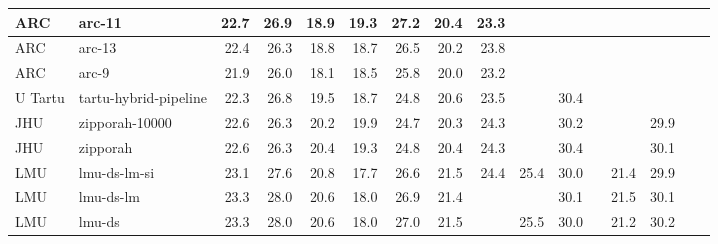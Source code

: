 \begin{table*}
\begin{center}
\begin{tabular}{|l|l|rrrrrrr|rrrrrrr|}
ARC & arc-11 & 22.7 & 26.9 & 18.9 & 19.3 & 27.2 & 20.4 & 23.3 & \cellcolor{lightgreen}{26.1} & \cellcolor{lightyellow}{30.8} & \cellcolor{lightyellow}{22.7} & \cellcolor{lightgreen}{22.4} & \cellcolor{lightyellow}{30.9} & \cellcolor{lightyellow}{23.5} & \cellcolor{lightgreen}{26.6} \\ \hline
ARC & arc-13 & 22.4 & 26.3 & 18.8 & 18.7 & 26.5 & 20.2 & 23.8 & \cellcolor{lightgreen}{26.1} & \cellcolor{lightyellow}{30.6} & \cellcolor{lightgreen}{22.8} & \cellcolor{lightgreen}{22.3} & \cellcolor{lightyellow}{30.9} & \cellcolor{lightyellow}{23.4} & \cellcolor{lightgreen}{26.7} \\ \hline
ARC & arc-9 & 21.9 & 26.0 & 18.1 & 18.5 & 25.8 & 20.0 & 23.2 & \cellcolor{lightyellow}{26.0} & \cellcolor{lightyellow}{30.7} & \cellcolor{lightyellow}{22.7} & \cellcolor{lightgreen}{22.1} & \cellcolor{lightyellow}{30.9} & \cellcolor{lightyellow}{23.4} & \cellcolor{lightyellow}{26.3} \\ \hline
U Tartu & tartu-hybrid-pipeline & 22.3 & 26.8 & 19.5 & 18.7 & 24.8 & 20.6 & 23.5 & \cellcolor{lightyellow}{25.7} & 30.4 & \cellcolor{lightyellow}{22.3} & \cellcolor{lightyellow}{21.9} & \cellcolor{lightyellow}{30.5} & \cellcolor{lightyellow}{23.1} & \cellcolor{lightyellow}{26.1} \\ \hline
JHU & zipporah-10000 & 22.6 & 26.3 & 20.2 & 19.9 & 24.7 & 20.3 & 24.3 & \cellcolor{lightyellow}{25.8} & 30.2 & \cellcolor{lightyellow}{22.6} & \cellcolor{lightgreen}{22.1} & 29.9 & \cellcolor{lightyellow}{23.4} & \cellcolor{lightyellow}{26.4} \\ \hline
JHU & zipporah & 22.6 & 26.3 & 20.4 & 19.3 & 24.8 & 20.4 & 24.3 & \cellcolor{lightyellow}{25.8} & 30.4 & \cellcolor{lightyellow}{22.6} & \cellcolor{lightgreen}{22.1} & 30.1 & \cellcolor{lightyellow}{23.3} & \cellcolor{lightgreen}{26.5} \\ \hline
LMU & lmu-ds-lm-si & 23.1 & 27.6 & 20.8 & 17.7 & 26.6 & 21.5 & 24.4 & 25.4 & 30.0 & \cellcolor{lightyellow}{22.3} & 21.4 & 29.9 & \cellcolor{lightyellow}{23.1} & \cellcolor{lightyellow}{26.0} \\ \hline
LMU & lmu-ds-lm & 23.3 & 28.0 & 20.6 & 18.0 & 26.9 & 21.4 & \cellcolor{lightyellow}{24.7} & \cellcolor{lightyellow}{25.6} & 30.1 & \cellcolor{lightyellow}{22.4} & 21.5 & 30.1 & \cellcolor{lightyellow}{23.1} & \cellcolor{lightyellow}{26.2} \\ \hline
LMU & lmu-ds & 23.3 & 28.0 & 20.6 & 18.0 & 27.0 & 21.5 & \cellcolor{lightyellow}{24.6} & 25.5 & 30.0 & \cellcolor{lightyellow}{22.3} & 21.2 & 30.2 & \cellcolor{lightyellow}{23.2} & \cellcolor{lightyellow}{26.1} \\ \hline

\end{tabular}
\end{center}
\end{table*}
